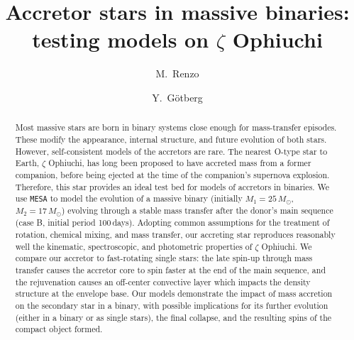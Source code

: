 \documentclass[twocolumn,twocolappendix,trackchanges]{aastex63}
\begin{document}
\graphicspath{{./figures/}}


\title{Accretor stars in massive binaries: testing models on  $\zeta$ Ophiuchi}

\author[0000-0002-6718-9472]{M.~Renzo}

\author[0000-0002-6960-6911]{Y.~G\"otberg}


\begin{abstract}
  Most massive stars are born in binary systems close enough
  for mass-transfer episodes. These modify the appearance, internal
  structure, and future evolution of both stars. However,
  self-consistent models of the accretors are rare.  The nearest
  O-type star to Earth, $\zeta$ Ophiuchi, has long been
  proposed to have accreted mass from a former companion, before being
  ejected at the time of the companion's supernova
  explosion. Therefore, this star provides an ideal test bed for
  models of accretors in binaries. We use %
  \texttt{MESA} to model the evolution of a massive binary (initially
  $M_1=25\,M_\odot$, $M_2=17\,M_\odot$) evolving through a stable mass
  transfer after the donor's main sequence (case B, initial period
  100\,days). Adopting common assumptions for the treatment of
  rotation, chemical mixing, and mass transfer, our accreting star
  reproduces reasonably well the kinematic, spectroscopic, and
  photometric properties of $\zeta$ Ophiuchi. We compare our accretor
  to fast-rotating single stars: the late spin-up through
  mass transfer causes the accretor core to spin faster at the end of
  the main sequence, and the rejuvenation causes an off-center
  convective layer which impacts the density structure at the envelope base.
  Our models demonstrate the impact of
  mass accretion on the secondary star in a binary, with possible
  implications for its further evolution (either in a binary or as
  single stars), the final collapse, and the resulting spins of the
  compact object formed.
\end{abstract}

\vspace*{-10pt}
\end{document}
